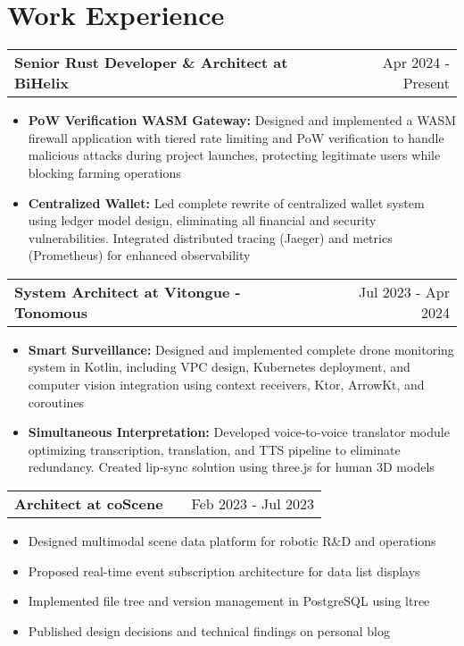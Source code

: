 \documentclass[a4paper,12pt]{article}
\makeatletter
\newenvironment{joblong}[2]
    {
    \begin{tabularx}{\linewidth}{@{}l X r@{}}
    \textbf{#1} & \hfill &  #2 \\[3.75pt]
    \end{tabularx}
    \begin{minipage}[t]{\linewidth}
    \begin{itemize}[nosep,after=\strut, leftmargin=1em, itemsep=3pt,label=--]
    }
    {
    \end{itemize}
    \end{minipage}    
    }
\makeatother
\begin{document}
\section{Work Experience}

\begin{joblong}{Senior Rust Developer \& Architect at BiHelix}{Apr 2024 - Present}
\item \textbf{PoW Verification WASM Gateway:} Designed and implemented a WASM firewall application with tiered rate limiting and PoW verification to handle malicious attacks during project launches, protecting legitimate users while blocking farming operations
\item \textbf{Centralized Wallet:} Led complete rewrite of centralized wallet system using ledger model design, eliminating all financial and security vulnerabilities. Integrated distributed tracing (Jaeger) and metrics (Prometheus) for enhanced observability
\end{joblong}

\begin{joblong}{System Architect at Vitongue - Tonomous}{Jul 2023 - Apr 2024}
\item \textbf{Smart Surveillance:} Designed and implemented complete drone monitoring system in Kotlin, including VPC design, Kubernetes deployment, and computer vision integration using context receivers, Ktor, ArrowKt, and coroutines
\item \textbf{Simultaneous Interpretation:} Developed voice-to-voice translator module optimizing transcription, translation, and TTS pipeline to eliminate redundancy. Created lip-sync solution using three.js for human 3D models
\end{joblong}

\begin{joblong}{Architect at coScene}{Feb 2023 - Jul 2023}
\item Designed multimodal scene data platform for robotic R\&D and operations
\item Proposed real-time event subscription architecture for data list displays
\item Implemented file tree and version management in PostgreSQL using ltree
\item Published design decisions and technical findings on personal blog
\end{joblong}
\end{document}
